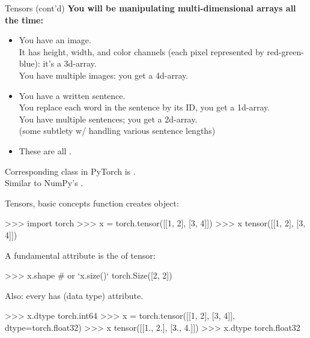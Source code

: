 \begin{frame}{Tensors (cont'd)}
\textbf{You will be manipulating multi-dimensional arrays all the time:}
\vsp
\begin{itemize}
\item You have an image.\\ It has height, width, and color channels (each pixel represented by red-green-blue): it's a 3d-array.\\ You have multiple images: you get a 4d-array.
\pause
\item You have a written sentence. \\You replace each word in the sentence by its ID, you get a 1d-array.\\ You have multiple sentences; you get a 2d-array.\\ (some subtlety w/ handling various sentence lengths)
\pause
\item These are all .
\end{itemize}
\vsp
Corresponding class in PyTorch is .\\
Similar to NumPy's .
\end{frame}

\begin{frame}[fragile]{Tensors, basic concepts}
\vspace{-7mm}
 function creates  object:
\begin{python}
>>> import torch
>>> x = torch.tensor([[1, 2], [3, 4]])
>>> x
tensor([[1, 2],
        [3, 4]])
\end{python}
\pause
A fundamental attribute is the  of tensor:
\begin{python}
>>> x.shape  # or `x.size()`
torch.Size([2, 2])
\end{python}
\pause
Also: every  has  (data type) attribute.
\vspace{-1mm}
\begin{python}
>>> x.dtype
torch.int64
>>> x = torch.tensor([[1, 2], [3, 4]], dtype=torch.float32)
>>> x
tensor([[1., 2.],
        [3., 4.]])
>>> x.dtype
torch.float32
\end{python}
\end{frame}

